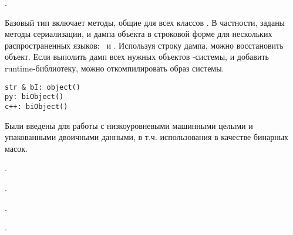 

\secdown

.


Базовый тип включает методы, общие для всех классов \bi.
В частности, заданы методы сериализации, и дампа объекта в строковой форме для
нескольких распространенных языков: \py\ и \cpp. Используя строку дампа, можно
восстановить объект. Если выполить дамп всех нужных объектов \bi-системы,
и добавить runtime-библиотеку, можно откомпилировать образ системы.


\begin{verbatim}
str & bI: object()
py: biObject()
c++: biObject()
\end{verbatim}

\secdown








Были введены для работы с низкоуровневыми машинными целыми и упакованными
двоичными данными, в т.ч. использования в качестве бинарных масок.


\secup

.

\secdown
{}

\secup

.

\secdown


\secup

.

\secdown
{}
\secup

.

\secdown


